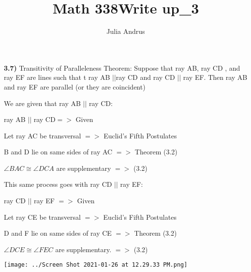\documentclass{article}
\title{Math 338\:Write up\_3}
\author{Julia Andrus}
\date{}
\begin{document}
\maketitle

\textbf{3.7)} Transitivity of Paralleleness Theorem: Suppose that ray AB,  ray CD , and ray EF  are lines such that t ray  AB  $||$ray CD and ray CD  $||$ ray EF.  Then ray AB and ray EF are parallel (or they are coincident)

\vspace{2mm}



We are given that ray AB $||$ ray CD:

\vspace{2mm}

ray AB $||$ ray CD$=>$ Given

\vspace{2mm}

Let ray AC be transversal $=>$ Euclid's Fifth Postulates

\vspace{2mm}

B and D lie on same sides of ray AC $=>$ Theorem (3.2)

\vspace{2mm}

$\angle{BAC} \displaystyle \cong \angle {DCA}$ are supplementary $ =>$ (3.2)

\vspace{5mm}

This same process goes with ray CD $||$ ray EF:

\vspace{2mm}


ray CD $||$ ray EF $=>$ Given

\vspace{2mm}

Let ray CE be transversal $=>$ Euclid's Fifth Postulates

\vspace{2mm}

D and F lie on same sides of ray CE  $=>$ Theorem (3.2)

\vspace{2mm}

$\angle{DCE} \displaystyle \cong \angle {FEC}$ are supplementary. $=>$ (3.2)

\vspace{2mm}

\texttt{[image: ../Screen Shot 2021-01-26 at 12.29.33 PM.png]} 
\end{document}
